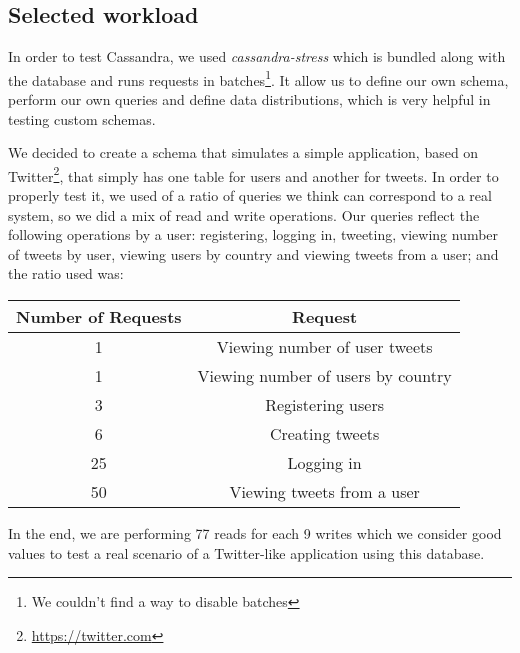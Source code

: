 \documentclass[runningheads]{llncs}
\begin{document}

\subsection{Selected workload}

In order to test Cassandra, we used \emph{cassandra-stress} which is bundled along with the database and runs requests in batches\footnote{We couldn't find a way to disable batches}. It allow us to define our own schema, perform our own queries and define data distributions, which is very helpful in testing custom schemas.\par
We decided to create a schema that simulates a simple application, based on Twitter\footnote{\url{https://twitter.com}}, that simply has one table for users and another for tweets. In order to properly test it, we used of a ratio of queries we think can correspond to a real system, so we did a mix of read and write operations. Our queries reflect the following operations by a user: registering, logging in, tweeting, viewing number of tweets by user, viewing users by country and viewing tweets from a user; and the ratio used was:
\begin{center}
    \begin{tabular}{|c|c|}
       \hline
            Number of Requests & Request \\
       \hline
        1 & Viewing number of user tweets \\
        1 & Viewing number of users by country \\
        3 & Registering users \\
        6 & Creating tweets \\
       25 & Logging in \\
       50 & Viewing tweets from a user \\
       \hline
    \end{tabular}
\end{center}

In the end, we are performing 77 reads for each 9 writes which we consider good values to test a real scenario of a Twitter-like application using this database.

\end{document}
